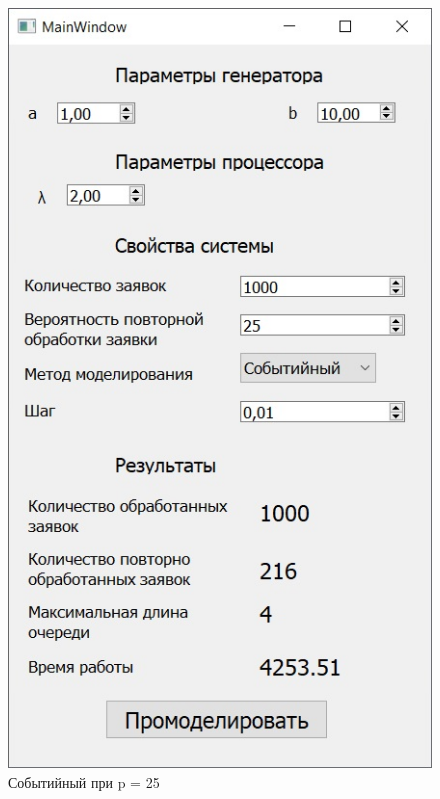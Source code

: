 \documentclass[14pt, a4paper]{extarticle}
\begin{document}
\begin{figure}[h!]
	\centering
	\includegraphics[scale=0.6]{source/event25.jpg}
	\caption{Событийный при p = 25}
\end{figure}
\newpage
\end{document}
